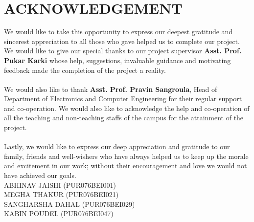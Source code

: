 \newpage

\section*{ACKNOWLEDGEMENT}

We would like to take this opportunity to express our deepest gratitude and sincerest appreciation to all those who gave helped us to complete our project. We would like to give our special thanks to our project supervisor { \bf Asst. Prof. Pukar Karki} whose help, suggestions, invaluable guidance and motivating feedback made the completion of the project a reality.\\
\\
We would also like to thank {\bf Asst. Prof. Pravin Sangroula}, Head of Department of Electronics and Computer Engineering for their regular support and co-operation. We would also like to acknowledge the help and co-operation of all the teaching and non-teaching staffs of the campus for the attainment of the project.\\
\\
Lastly, we would like to express our deep appreciation and gratitude to our family, friends and well-wishers who have always helped us to keep up the morale and excitement in our work; without their encouragement and love we would not have achieved
our goals.
\vspace{1cm}\\
ABHINAV JAISHI (PUR076BEI001)\\
MEGHA THAKUR (PUR076BEI021)\\
SANGHARSHA DAHAL (PUR076BEI029)\\
KABIN POUDEL (PUR076BEI047)\\
\\
